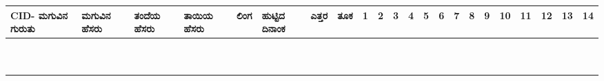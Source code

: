 ﻿\documentclass[12pt]{article}
\newcommand{\kn}[1]{%
{\fontspec[Script=Kannada]{Kedage}%
#1
}}
\begin{document}
\begin{tabular}{|p{2cm}|p{3cm}|p{2.8cm}|p{2.8cm}|p{1cm}|p{1cm}|l|l|l|l|l|l|l|l|l|l|l|l|l|l|l|l|}
CID-\kn{ಮಗುವಿನ ಗುರುತು} & \kn{ಮಗುವಿನ ಹೆಸರು} & \kn{ತಂದೆಯ ಹೆಸರು} & \kn{ತಾಯಿಯ ಹೆಸರು} & \kn{ಲಿಂಗ} & \kn{ಹುಟ್ಟಿದ ದಿನಾಂಕ} & \kn{ಎತ್ತರ} & \kn{ತೂಕ} & 1 & 2 & 3 & 4 & 5 & 6 & 7 & 8 & 9 & 10 & 11 & 12 & 13 & 14\\ \hline
 &  &  &  &  &  & & & & & & & & & & & & & & & &  \\ \hline
 &  &  &  &  &  & & & & & & & & & & & & & & & &  \\ \hline
 &  &  &  &  &  & & & & & & & & & & & & & & & &  \\ \hline
 &  &  &  &  &  & & & & & & & & & & & & & & & &  \\ \hline
 &  &  &  &  &  & & & & & & & & & & & & & & & &  \\ \hline
 &  &  &  &  &  & & & & & & & & & & & & & & & &  \\ \hline
 &  &  &  &  &  & & & & & & & & & & & & & & & &  \\ \hline
 &  &  &  &  &  & & & & & & & & & & & & & & & &  \\ \hline
 &  &  &  &  &  & & & & & & & & & & & & & & & &  \\ \hline
 &  &  &  &  &  & & & & & & & & & & & & & & & &  \\ \hline

\end{tabular}

\pagebreak

\end{document}
